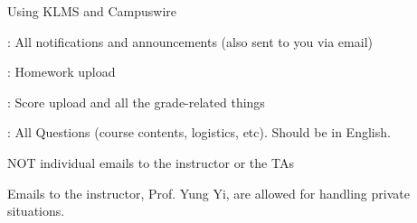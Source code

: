 










\begin{frame}{Using KLMS and Campuswire}

  \plitemsep 0.1in
  \bci

\item<1-> : All notifications and announcements (also sent to
    you via email)



    \item<2-> : Homework upload
   \item<3-> : Score upload and all the grade-related things

        \bigskip
        
      \item<4-> : All Questions (course contents,
        logistics, etc). Should be in English.

    \bigskip
  \item<5-> NOT individual emails to the instructor or the TAs

  \item<6-> Emails to the instructor, Prof. Yung Yi, are allowed
    for handling private situations.



    \eci

\end{frame}

